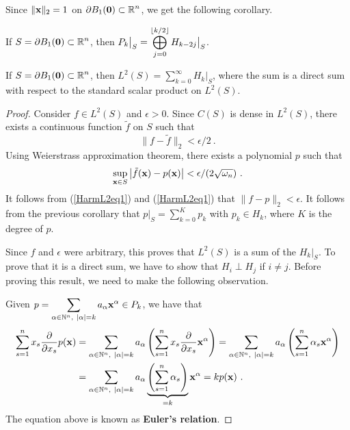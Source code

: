 Since $\|\VEC{x}\|_2 = 1$ on
$\displaystyle \partial B_1(\VEC{0}) \subset \RR^n$, we
get the following corollary.

\begin{cor}
If $\displaystyle S = \partial B_1(\VEC{0}) \subset \RR^n$, then
$\displaystyle P_k\big|_S = \bigoplus_{j=0}^{\intpt{k/2}} H_{k-2j}\big|_S$.
\end{cor}

\begin{theorem} \label{L2DecHk}
If $\displaystyle S = \partial B_1(\VEC{0}) \subset \RR^n$, then
$\displaystyle L^2(S) = \sum_{k=0}^\infty H_k\big|_S$, where the sum
is a direct sum with respect to the standard scalar product on
$\displaystyle L^2(S)$.
\end{theorem}

\begin{proof}
Consider $\displaystyle f \in L^2(S)$ and $\epsilon >0$.  Since $C(S)$
is dense in $\displaystyle L^2(S)$, there exists a continuous function
$\tilde{f}$ on $S$ such that
\begin{equation} \label{HarmL2eq1}
  \|f - \tilde{f}\|_2 < \epsilon/2 \ .
\end{equation}
Using Weierstrass approximation theorem, there exists a polynomial $p$
such that
\begin{equation} \label{HarmL2eq2}
\sup_{\VEC{x} \in S} \big|\tilde{f}(\VEC{x}) - p(\VEC{x})\big|
< \epsilon/(2\sqrt{\omega_n}) \ .
\end{equation}
It follows from (\ref{HarmL2eq1}) and (\ref{HarmL2eq1}) that
$\|f - p \|_2 < \epsilon$.
It follows from the previous corollary that
$\displaystyle p\big|_S = \sum_{k=0}^K p_k$ with
$p_k \in H_k$, where $K$ is the degree of $p$.

Since $f$ and $\epsilon$ were arbitrary, this proves that
$\displaystyle L^2(S)$ is a sum of the $H_k\big|_S$.  To prove that it
is a direct sum, we have to show that $H_i \perp H_j$ if $i \neq j$.  Before
proving this result, we need to make the following observation.

Given $\displaystyle p = \sum_{\alpha \in \NN^n,\ |\alpha| = k} a_{\alpha}
\VEC{x}^{\alpha} \in P_k$, we have that
\begin{align*}
\sum_{s=1}^n x_s \pdfdx{p}{x_s}(\VEC{x})
& = \sum_{\alpha \in \NN^n,\ |\alpha| = k} a_{\alpha}
\left( \sum_{s=1}^n x_s \pdydx{}{x_s} \VEC{x}^{\alpha} \right)
 =  \sum_{\alpha \in \NN^n,\ |\alpha| = k} a_{\alpha}
\left( \sum_{s=1}^n \alpha_s \VEC{x}^{\alpha} \right) \\
&=  \sum_{\alpha \in \NN^n,\ |\alpha| = k} a_{\alpha}
\underbrace{\left( \sum_{s=1}^n \alpha_s\right)}_{=k} \VEC{x}^{\alpha}
= k p(\VEC{x}) \ .
\end{align*}
The equation above is known as {\bfseries Euler's relation}.


\end{proof}
